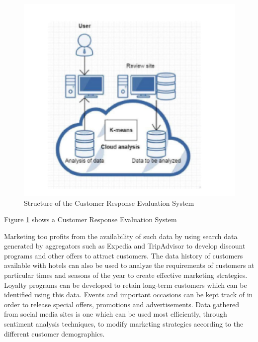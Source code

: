 \documentclass[sigconf]{acmart}
\begin{document}
\begin{figure}
	\includegraphics[width=\columnwidth]{images/evaluation_system.jpg}
	\caption{Structure of the Customer Response Evaluation System \cite {jianfangwang07}}
        \label{F:Figure2}
\end{figure}
Figure \ref{F:Figure2} shows a Customer Response Evaluation System

Marketing too profits from the availability of such data by using search data generated by aggregators such as Expedia and TripAdvisor to develop discount programs and other offers to attract customers. The data history of customers available with hotels can also be used to analyze the requirements of customers at particular times and seasons of the year to create effective marketing strategies. Loyalty programs can be developed to retain long-term customers which can be identified using this data. Events and important occasions can be kept track of in order to release special offers, promotions and advertisements. Data gathered from social media sites is one which can be used most efficiently, through sentiment analysis techniques, to modify marketing strategies according to the different customer demographics.
\end{document}
